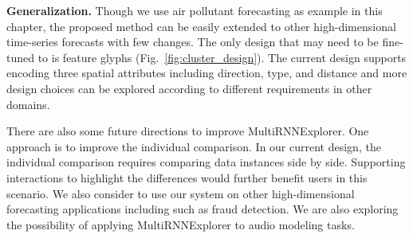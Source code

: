 \textbf{Generalization.}
Though we use air pollutant forecasting as example in this chapter, the proposed method can be easily extended to other high-dimensional time-series forecasts with few changes.
The only design that may need to be fine-tuned to is feature glyphs (Fig.~\ref{fig:cluster_design}).
The current design supports encoding three spatial attributes including direction, type, and distance and more design choices can be explored according to different requirements in other domains. 


There are also some future directions to improve MultiRNNExplorer.
One approach is to improve the individual comparison. 
In our current design, the individual comparison requires comparing data instances side by side. 
Supporting interactions to highlight the differences would further benefit users in this scenario.
We also consider to use our system on other high-dimensional forecasting applications including such as fraud detection\cite{jurgovsky2018sequence}. 
We are also exploring the possibility of applying MultiRNNExplorer to audio modeling tasks. 

